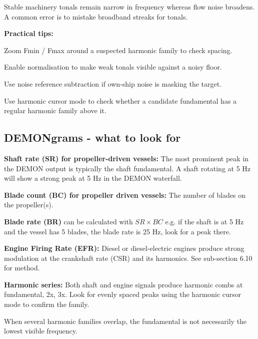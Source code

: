 \begin{learnpoint}
    Stable machinery tonals remain narrow in frequency whereas flow noise broadens. A common error is to mistake broadband streaks for tonals.
\end{learnpoint}

\textbf{Practical tips:}
\begin{compactitem}
    \item Zoom Fmin / Fmax around a suspected harmonic family to check spacing.
    \item Enable normalisation to make weak tonals visible against a noisy floor.
    \item Use noise reference subtraction if own-ship noise is masking the target.
    \item Use harmonic cursor mode to check whether a candidate fundamental has a regular harmonic family above it.
\end{compactitem}

\subsection{DEMONgrams - what to look for}

\begin{compactitem}
    \item \textbf{Shaft rate (SR) for propeller-driven vessels:} The most prominent peak in the DEMON output is typically the shaft fundamental. A shaft rotating at 5 Hz will show a strong peak at 5 Hz in the DEMON waterfall.
    \item \textbf{Blade count (BC) for propeller driven vessels:} The number of blades on the propeller(s).
    \item \textbf{Blade rate (BR)} can be calculated with $SR \times BC$ e.g. if the shaft is at 5 Hz and the vessel has 5 blades, the blade rate is 25 Hz, look for a peak there.
    \item \textbf{Engine Firing Rate (EFR):} Diesel or diesel-electric engines produce strong modulation at the crankshaft rate (CSR) and its harmonics. See sub-section 6.10 for method.
    \item \textbf{Harmonic series:} Both shaft and engine signals produce harmonic combs at fundamental, 2x, 3x. Look for evenly spaced peaks using the harmonic cursor mode to confirm the family.
\end{compactitem}

\begin{learnpoint}
    When several harmonic families overlap, the fundamental is not necessarily the lowest visible frequency.
\end{learnpoint}

